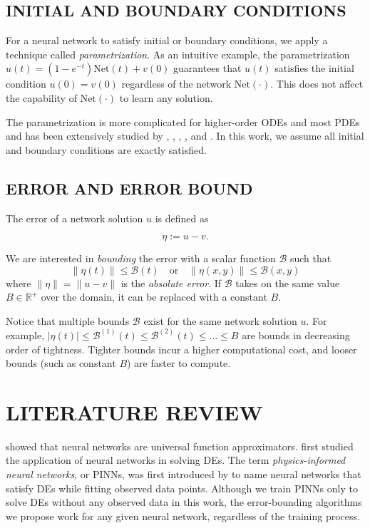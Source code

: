 \documentclass{uai2023}
\newcommand{\Err}{\eta}
\newcommand{\Bound}{\mathcal{B}}
\newcommand{\Net}{\mathrm{Net}}
\begin{document}
\subsection{INITIAL AND BOUNDARY CONDITIONS}\label{section:initial-and-boundary-conditions}
    For a neural network to satisfy initial or boundary conditions, we apply a technique called \textit{parametrization}. 
    As an intuitive example, the parametrization $u(t) = (1 - e^{-t}) \Net(t) + v(0)$ guarantees that $u(t)$ satisfies the initial condition $u(0)=v(0)$ regardless of the network $\Net(\cdot)$.
    This does not affect the capability of $\Net(\cdot)$ to learn any solution.

    The parametrization is more complicated for higher-order ODEs and most PDEs and has been extensively studied by \cite{lagaris1998artificial}, \cite{lagaris2000neural}, \cite{mcfall2009artificial}, \cite{lagari2020systematic}, and \cite{sukumar2021exact}.
    In this work, we assume all initial and boundary conditions are exactly satisfied.

\subsection{ERROR AND ERROR BOUND}
    The error of a network solution $u$ is defined as 
    {
        \small
        \begin{equation}
            \Err := u - v.
        \end{equation}

    }
    We are interested in \textit{bounding} the error with a scalar function $\Bound$ such that 
    {
        \small
        \begin{equation}
            \|\Err(t)\| \leq \Bound(t) \quad \text{or} \quad \|\Err(x, y)\| \leq \Bound(x, y)
        \end{equation}
    }
    where $\|\Err\| = \|u - v\|$ is the \textit{absolute error}.
    If $\Bound$ takes on the same value $B \in \mathbb{R}^{+}$ over the domain, it can be replaced with a constant $B$.

    Notice that multiple bounds $\Bound$ exist for the same network solution $u$.
    For example, $|\Err(t)| \leq \Bound^{(1)}(t) \leq  \Bound^{(2)}(t) \leq \dots \leq B$ are bounds in decreasing order of tightness. Tighter bounds incur a higher computational cost, and looser bounds (such as constant $B$) are faster to compute.

\section{LITERATURE REVIEW} \label{section:literature-review}
    \citeauthor{hornik1989multilayer} showed that neural networks are universal function approximators. 
    \citeauthor{lagaris1998artificial} first studied the application of neural networks in solving DEs.
    The term \textit{physics-informed neural networks}, or PINNs, was first introduced by \citeauthor{raissi2019physics} to name neural networks that satisfy DEs while fitting observed data points. 
    Although we train PINNs only to solve DEs without any observed data in this work, the error-bounding algorithms we propose work for any given neural network, regardless of the training process.
\end{document}
